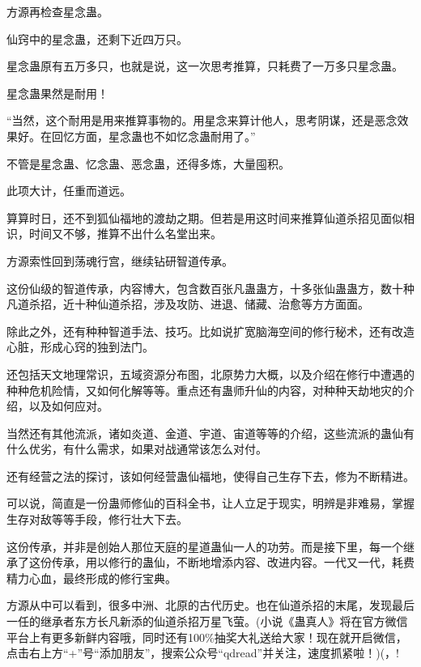 \begin{this_body}
方源再检查星念蛊。

仙窍中的星念蛊，还剩下近四万只。

星念蛊原有五万多只，也就是说，这一次思考推算，只耗费了一万多只星念蛊。

星念蛊果然是耐用！

“当然，这个耐用是用来推算事物的。用星念来算计他人，思考阴谋，还是恶念效果好。在回忆方面，星念蛊也不如忆念蛊耐用了。”

不管是星念蛊、忆念蛊、恶念蛊，还得多炼，大量囤积。

此项大计，任重而道远。

算算时日，还不到狐仙福地的渡劫之期。但若是用这时间来推算仙道杀招见面似相识，时间又不够，推算不出什么名堂出来。

方源索性回到荡魂行宫，继续钻研智道传承。

这份仙级的智道传承，内容博大，包含数百张凡蛊蛊方，十多张仙蛊蛊方，数十种凡道杀招，近十种仙道杀招，涉及攻防、进退、储藏、治愈等方方面面。

除此之外，还有种种智道手法、技巧。比如说扩宽脑海空间的修行秘术，还有改造心脏，形成心窍的独到法门。

还包括天文地理常识，五域资源分布图，北原势力大概，以及介绍在修行中遭遇的种种危机险情，又如何化解等等。重点还有蛊师升仙的内容，对种种天劫地灾的介绍，以及如何应对。

当然还有其他流派，诸如炎道、金道、宇道、宙道等等的介绍，这些流派的蛊仙有什么优劣，有什么需求，如果对战通常该怎么对付。

还有经营之法的探讨，该如何经营蛊仙福地，使得自己生存下去，修为不断精进。

可以说，简直是一份蛊师修仙的百科全书，让人立足于现实，明辨是非难易，掌握生存对敌等等手段，修行壮大下去。

这份传承，并非是创始人那位天庭的星道蛊仙一人的功劳。而是接下里，每一个继承了这份传承，用以修行的蛊仙，不断地增添内容、改进内容。一代又一代，耗费精力心血，最终形成的修行宝典。

方源从中可以看到，很多中洲、北原的古代历史。也在仙道杀招的末尾，发现最后一任的继承者东方长凡新添的仙道杀招万星飞萤。(小说《蛊真人》将在官方微信平台上有更多新鲜内容哦，同时还有100\%抽奖大礼送给大家！现在就开启微信，点击右上方“+”号“添加朋友”，搜索公众号“qdread”并关注，速度抓紧啦！)(，!

\end{this_body}

